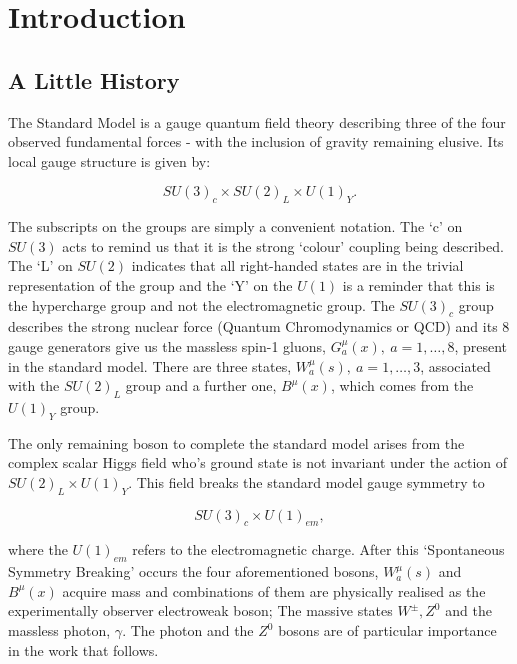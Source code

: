 \chapter{Introduction}
\label{chap:intro}

\section{A Little History}
\label{sec:history}


	The Standard Model is a gauge quantum field theory describing three of the four observed fundamental forces - with the inclusion of gravity remaining elusive.
	Its local gauge structure is given by:

	\begin{equation}
		SU(3)_c\times SU(2)_L\times U(1)_Y.
		\label{eq:SMGauge}
	\end{equation}

	The subscripts on the groups are simply a convenient notation.  The `c' on $SU(3)$ acts to remind us that it is
	the strong `colour' coupling being described.  The `L' on $SU(2)$ indicates that all right-handed states are in
	the trivial representation of the group and the `Y' on the $U(1)$ is a reminder that this is the hypercharge group
	and not the electromagnetic group. The $SU(3)_c$ group describes the strong nuclear force (Quantum Chromodynamics
	or QCD) and its 8 gauge generators give us the massless spin-1 gluons, $G_a^\mu(x),\ a=1,\ldots,8$, present in
	the standard model. There are three states, $W_a^\mu(s),\ a=1,\ldots,3$, associated with the $SU(2)_L$ group and
	a further one, $B^\mu(x)$, which comes from the $U(1)_Y$ group.

	The only remaining boson to complete the standard model arises from the complex scalar Higgs field who's ground state is not invariant under the action of $SU(2)_L\times U(1)_Y$.
	This field breaks the standard model gauge symmetry to

	\begin{equation}
		SU(3)_c\times U(1)_{em},
		\label{eq:SMGaugeBroken}
	\end{equation}

	where the $U(1)_{em}$ refers to the electromagnetic charge.  After this `Spontaneous Symmetry Breaking' occurs the four aforementioned bosons, $W_a^\mu(s)$ and $B^\mu(x)$
	acquire mass and combinations of them are physically realised as the experimentally observer electroweak boson; The massive states $W^\pm, Z^0$ and the massless photon, $\gamma$.
	The photon and the $Z^0$ bosons are of particular importance in the work that follows.

